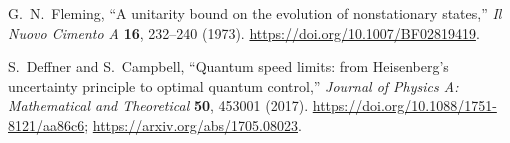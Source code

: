 G.~N.~Fleming, ``A unitarity bound on the evolution of nonstationary states,''
\emph{Il Nuovo Cimento A} \textbf{16}, 232--240 (1973).
\url{https://doi.org/10.1007/BF02819419}.

S.~Deffner and S.~Campbell,
``Quantum speed limits: from Heisenberg's uncertainty principle to optimal quantum control,''
\emph{Journal of Physics A: Mathematical and Theoretical} \textbf{50}, 453001 (2017).
\url{https://doi.org/10.1088/1751-8121/aa86c6};
\url{https://arxiv.org/abs/1705.08023}.

